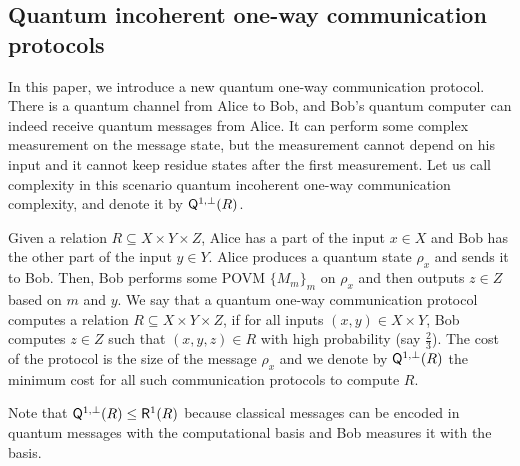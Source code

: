 \subsection{Quantum incoherent one-way communication protocols}

In this paper, we introduce a new quantum one-way communication protocol. There is a quantum channel from Alice to Bob, and Bob's quantum computer can indeed receive quantum messages from Alice. It can perform some complex measurement on the message state, but the measurement cannot depend on his input and it cannot keep residue states after the first measurement. Let us call complexity in this scenario quantum incoherent one-way communication complexity, and denote it by $\mathsf{Q}^{1,\perp}(R)$.

\begin{definition}\label{def:Q_one-way_incoherent}
    Given a relation $R \subseteq X \times Y \times Z$, Alice has a part of the input $x \in X$ and Bob has the other part of the input $y \in Y$. Alice produces a quantum state $\rho_x$ and sends it to Bob. Then, Bob performs some POVM $\{M_m\}_m$ on $\rho_x$ and then outputs $z \in Z$ based on $m$ and $y$. We say that a quantum one-way communication protocol computes a relation $R \subseteq X \times Y \times Z$, if for all inputs $(x,y) \in X \times Y$, Bob computes $z \in Z$ such that $(x,y,z) \in R$ with high probability (say $\frac{2}{3}$). The cost of the protocol is the size of the message $\rho_x$ and we denote by $\mathsf{Q}^{1,\perp}(R)$ the minimum cost for all such communication protocols to compute $R$.
\end{definition}

Note that $\mathsf{Q}^{1,\perp}(R) \leq \mathsf{R}^1(R)$ because classical messages can be encoded in quantum messages with the computational basis and Bob measures it with the basis.